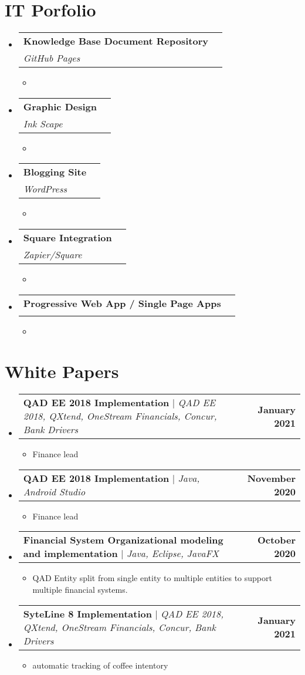 \documentclass[letterpaper,11pt]{article}
\makeatletter
\newcommand{\resumeItem}[1]{
  \item\small{
    {#1 \vspace{-2pt}}
  }
}
\newcommand{\resumeSubheading}[4]{
  \vspace{-2pt}\item
    \begin{tabular*}{1.0\textwidth}[t]{l@{\extracolsep{\fill}}r}
      \textbf{#1} & \textbf{\small #2} \\
      \textit{\small#3} & \textit{\small #4} \\
    \end{tabular*}\vspace{-7pt}
}
\newcommand{\resumeProjectHeading}[2]{
    \item
    \begin{tabular*}{1.001\textwidth}{l@{\extracolsep{\fill}}r}
      \small#1 & \textbf{\small #2}\\
    \end{tabular*}\vspace{-7pt}
}
\newcommand{\resumeSubHeadingListStart}{\begin{itemize}[leftmargin=0.0in, label={}]}
\newcommand{\resumeSubHeadingListEnd}{\end{itemize}}
\newcommand{\resumeItemListStart}{\begin{itemize}}
\newcommand{\resumeItemListEnd}{\end{itemize}\vspace{-5pt}}
\makeatother
\begin{document}
\section{IT Porfolio}

    \resumeSubHeadingListStart
        \resumeSubheading{Knowledge Base Document Repository}{}{GitHub Pages}{}
            \resumeItemListStart
                \resumeItem{}
            \resumeItemListEnd
    \resumeSubHeadingListEnd

    \resumeSubHeadingListStart
        \resumeSubheading{Graphic Design}{}{Ink Scape}{}
            \resumeItemListStart
                \resumeItem{}
            \resumeItemListEnd
    \resumeSubHeadingListEnd    

    \resumeSubHeadingListStart
        \resumeSubheading{Blogging Site}{}{WordPress}{}
            \resumeItemListStart
                \resumeItem{}
            \resumeItemListEnd
    \resumeSubHeadingListEnd

    \resumeSubHeadingListStart
        \resumeSubheading{Square Integration}{}{Zapier/Square}{}
            \resumeItemListStart
                \resumeItem{}
            \resumeItemListEnd
    \resumeSubHeadingListEnd  
    
    \resumeSubHeadingListStart
    \resumeSubheading{Progressive Web App / Single Page Apps}{}{}{}
        \resumeItemListStart
            \resumeItem{}
        \resumeItemListEnd
\resumeSubHeadingListEnd  

\section{White Papers}
    \vspace{-5pt}
    \resumeSubHeadingListStart
      \resumeProjectHeading
          {\textbf{QAD EE 2018 Implementation} $|$ \emph{QAD EE 2018, QXtend, OneStream Financials, Concur, Bank Drivers}}{January 2021}
          \resumeItemListStart
            \resumeItem{Finance lead }
          \resumeItemListEnd
          \vspace{-13pt}
      \resumeProjectHeading
          {\textbf{QAD EE 2018 Implementation} $|$ \emph{Java, Android Studio}}{November 2020}
          \resumeItemListStart
            \resumeItem{Finance lead}
          \resumeItemListEnd 
          \vspace{-13pt}
      \resumeProjectHeading
          {\textbf{Financial System Organizational modeling and implementation} $|$ \emph{Java, Eclipse, JavaFX}}{October 2020}
          \resumeItemListStart
            \resumeItem{QAD Entity split from single entity to multiple entities to support multiple financial systems.}
          \resumeItemListEnd 
      \resumeProjectHeading
          {\textbf{SyteLine 8 Implementation} $|$ \emph{QAD EE 2018, QXtend, OneStream Financials, Concur, Bank Drivers}}{January 2021}
          \resumeItemListStart
            \resumeItem{automatic tracking of coffee intentory }
          \resumeItemListEnd
          \vspace{-13pt}
    \resumeSubHeadingListEnd
\vspace{+16pt}
\end{document}
